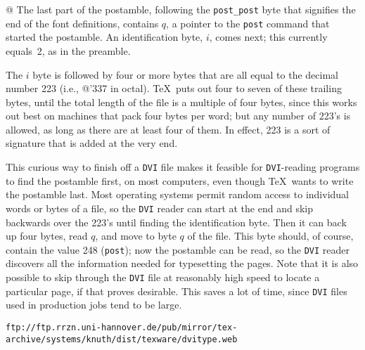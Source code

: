 \documentclass[10pt, a4paper]{article}
\begin{document}
@ The last part of the postamble, following the \texttt{post\_post} byte 
that signifies the end of the font definitions, 
contains $q$, a pointer to the \texttt{post} command 
that started the postamble.  
An identification byte, $i$, comes next; 
this currently equals~2, as in the preamble.

The $i$ byte is followed by four or more bytes that are all equal to
the decimal number 223 (i.e., @'337 in octal). \TeX\ puts out four to seven of
these trailing bytes, until the total length of the file is a multiple of
four bytes, since this works out best on machines that pack four bytes per
word; but any number of 223's is allowed, as long as there are at least four
of them. In effect, 223 is a sort of signature that is added at the very end.


This curious way to finish off a \texttt{DVI} file makes it feasible for
\texttt{DVI}-reading programs to find the postamble first, on most computers,
even though \TeX\ wants to write the postamble last. Most operating
systems permit random access to individual words or bytes of a file, so
the \texttt{DVI} reader can start at the end and skip backwards over the 223's
until finding the identification byte. Then it can back up four bytes, read
$q$, and move to byte $q$ of the file. This byte should, of course,
contain the value 248 (\texttt{post}); now the postamble can be read, so the
\texttt{DVI} reader discovers all the information needed for typesetting the
pages. Note that it is also possible to skip through the \texttt{DVI} file at
reasonably high speed to locate a particular page, if that proves
desirable. 
This saves a lot of time, 
since \texttt{DVI} files used in production jobs tend to be large.

\begin{Verbatim}[fontsize=\scriptsize]
ftp://ftp.rrzn.uni-hannover.de/pub/mirror/tex-archive/systems/knuth/dist/texware/dvitype.web
\end{Verbatim}
\end{document}
